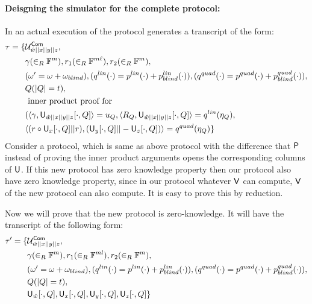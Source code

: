 \paragraph{Deisgning the simulator for the complete protocol: } In an actual execution of the protocol generates a transcript of the form:
\begin{align*}
\tau = \{ 
& \mathcal{U}^{\mathsf{Com}}_{\hat{w}||x||y||z},\\
& \gamma(\in_R \mathbb{F}^{m}), r_1(\in_R \mathbb{F}^{m\ell}), r_2(\in_R \mathbb{F}^m), \\ 
& (\omega' = \omega+\omega_{blind}), (q^{lin}(\cdot) = p^{lin}(\cdot)+p^{lin}_{blind}(\cdot)), (q^{quad}(\cdot) = p^{quad}(\cdot) + p^{quad}_{blind}(\cdot)),\\
& Q (|Q|=t),\\
& \text{ inner product proof for } \\
& (\langle \gamma,\mathsf{U}_{\hat{w}||x||y||z}[\cdot, Q]\rangle = u_Q, \langle R_Q,\mathsf{U}_{\hat{w}||x||y||z}[\cdot, Q]\rangle=q^{lin}(\eta_Q),\\
& \langle (r\circ \mathsf{U}_x[\cdot,Q]||r),(\mathsf{U}_y[\cdot,Q]||-\mathsf{U}_z[\cdot,Q])\rangle = q^{quad}(\eta_{Q})
\}
\end{align*}
Consider a protocol, which is same as above protocol with the difference that $\mathsf{P}$ instead of proving the inner product arguments opens the corresponding columns of $\mathsf{U}$. If this new protocol has zero knowledge property then our protocol also have zero knowledge property, since in our protocol whatever $\mathsf{V}$ can compute, $\mathsf{V}$ of the new protocol can also compute. It is easy to prove this by reduction.

Now we will prove that the new protocol is zero-knowledge. It will have the transcript of the following form:
\begin{align*}
\tau' = \{
& \mathcal{U}^{\mathsf{Com}}_{\hat{w}||x||y||z},\\
& \gamma(\in_R \mathbb{F}^{m}), r_1(\in_R \mathbb{F}^{ml}), r_2(\in_R \mathbb{F}^m), \\ 
& (\omega' = \omega+\omega_{blind}), (q^{lin}(\cdot) = p^{lin}(\cdot)+p^{lin}_{blind}(\cdot)), (q^{quad}(\cdot) = p^{quad}(\cdot) + p^{quad}_{blind}(\cdot)),\\
& Q (|Q|=t),\\
& \mathsf{U}_{\hat{w}}[\cdot, Q], \mathsf{U}_{x}[\cdot, Q], \mathsf{U}_{y}[\cdot, Q], \mathsf{U}_{z}[\cdot, Q]
\}
\end{align*}

